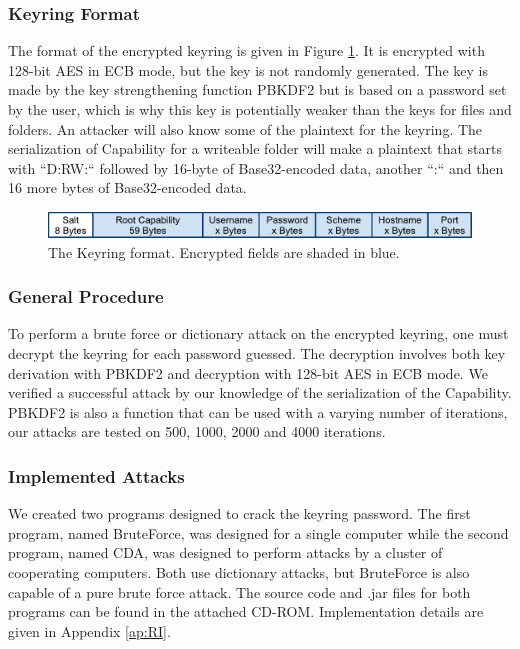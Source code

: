 \documentclass[pdftex,english,10pt,b5paper,twoside]{book}
\begin{document}
\subsubsection{Keyring Format} The format of the encrypted keyring is given in
Figure \ref{fig:KeyringFormat}.  It is encrypted with 128-bit \ac{AES} in
\ac{ECB} mode, but the key is not randomly generated.  The key is made by the
key strengthening function \ac{PBKDF2} but is based on a password set by the
user, which is why this key is potentially weaker than the keys for files and
folders. An attacker will also know some of the plaintext for the keyring. The
serialization of Capability for a writeable folder will make a plaintext that
starts with ``D:RW:`` followed by 16-byte of Base32-encoded data, another ``:``
and then 16 more bytes of Base32-encoded data.

\begin{figure}[h!]
    \centering
    \includegraphics[scale=0.6]{KeyringFormat.pdf}
    \caption{The Keyring format. Encrypted fields are shaded in blue.}
    \label{fig:KeyringFormat}
\end{figure}

\subsubsection{General Procedure} To perform a brute force or dictionary attack
on the encrypted keyring, one must decrypt the keyring for each password
guessed. The decryption involves both key derivation with \ac{PBKDF2} and
decryption with 128-bit \ac{AES} in \ac{ECB} mode. We verified a successful
attack by our knowledge of the serialization of the Capability. \ac{PBKDF2} is
also a function that can be used with a varying number of iterations, our
attacks are tested on 500, 1000, 2000 and 4000 iterations.

\subsubsection{Implemented Attacks} We created two programs designed to crack
the keyring password. The first program, named BruteForce, was designed for a
single computer while the second program, named \ac{CDA}, was designed to
perform attacks by a cluster of cooperating computers. Both use dictionary
attacks, but BruteForce is also capable of a pure brute force attack. The
source code and .jar files for both programs can be found in the attached
CD-ROM. Implementation details are given in Appendix \ref{ap:RI}.
\end{document}
